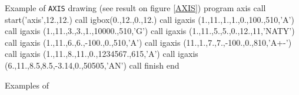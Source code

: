 \newpage

\begin{XMPt}{Example of {\tt AXIS} drawing (see result on figure \ref{AXIS})}
      program axis 
      call start('axis',12.,12.)
      call igbox(0.,12.,0.,12.)
      call igaxis (1.,11.,1.,1.,0.,100.,510,'A')
      call igaxis (1.,11.,3.,3.,1.,10000.,510,'G')
      call igaxis (1.,11.,5.,5.,0.,12.,11,'NATY')
      call igaxis (1.,11.,6.,6.,-100.,0.,510,'A')
      call igaxis (11.,1.,7.,7.,-100.,0.,810,'A+-')
      call igaxis (1.,11.,8.,11.,0.,1234567.,615,'A')
      call igaxis (6.,11.,8.5,8.5,-3.14,0.,50505,'AN')
      call finish
      end
\end{XMPt}
 
\begin{Fighere}
\begin{center}
\mbox{}
\end{center}
\caption{Examples of \protect{}}
\label{AXIS}
\end{Fighere}
 
\newpage

